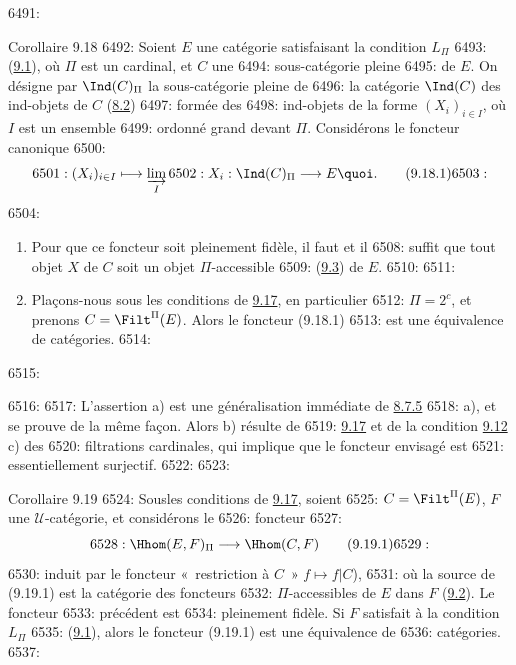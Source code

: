 6491: \begin{enonce*}{Corollaire 9.18}
6492: Soient $E$ une catégorie satisfaisant la condition $L_{\Pi}$
6493: (\hyperref[I.def9.1]{9.1}), où $\Pi$ est un cardinal, et $C$ une
6494: sous-catégorie pleine
6495: de $E$. On désigne par $\Ind(C)_{\Pi}$ la sous-catégorie pleine de
6496: la catégorie $\Ind(C)$ des ind-objets de $C$ (\hyperref[I.sec8.2]{8.2})
6497: formée des
6498: ind-objets de la forme $(X_i)_{i\in I}$, où $I$ est un ensemble
6499: ordonné grand devant $\Pi$. Considérons le foncteur canonique
6500: \begin{equation}
6501: (X_i)_{i\in I}\longmapsto \varinjlim_I
6502: X_i:\Ind(C)_{\Pi}\longrightarrow E{\quoi}.\tag{9.18.1}
6503: \end{equation}
6504: \begin{enumerate}
6505: \renewcommand{\theenumi}{\alph{enumi}}
6506: \renewcommand{\labelenumi}{\theenumi)}
6507: \item Pour que ce foncteur soit pleinement fidèle, il faut et il
6508: suffit que tout objet $X$ de $C$ soit un objet $\Pi$-accessible
6509: (\hyperref[I.def9.3]{9.3}) de $E$.
6510: 
6511: \item Plaçons-nous sous les conditions de \hyperref[I.cor9.17]{9.17}, en particulier
6512: $\Pi=2^c$, et prenons $C=\Filt^{\Pi}(E)$. Alors le foncteur (9.18.1)
6513: est une équivalence de catégories.
6514: \end{enumerate}
6515: \end{enonce*}
6516: 
6517: L'assertion a) est une généralisation immédiate de \hyperref[I.prop8.7.5]{8.7.5}
6518: a), et se prouve de la même façon. Alors b) résulte de
6519: \hyperref[I.cor9.17]{9.17} et de la condition \hyperref[I.def9.12]{9.12} c) des
6520: filtrations cardinales, qui implique que le foncteur envisagé est
6521: essentiellement surjectif.
6522: 
6523: \begin{enonce*}{Corollaire 9.19}
6524: Sous\pageoriginale les conditions de \hyperref[I.cor9.17]{9.17}, soient
6525: $C=\Filt^{\Pi}(E)$, $F$ une $𝒰$-catégorie, et considérons le
6526: foncteur
6527: \begin{equation}
6528: \Hhom(E,F)_{\Pi}\longrightarrow \Hhom(C,F)\tag{9.19.1}
6529: \end{equation}
6530: induit par le foncteur « restriction à $C$ » $f\mapsto f| C$),
6531: où la source de (9.19.1) est la catégorie des foncteurs
6532: $\Pi$-accessibles de $E$ dans $F$ (\hyperref[I.def9.2]{9.2}). Le foncteur
6533: précédent est
6534: pleinement fidèle. Si $F$ satisfait à la condition $L_{\Pi}$
6535: (\hyperref[I.def9.1]{9.1}), alors le foncteur (9.19.1) est une équivalence de
6536: catégories.
6537: \end{enonce*}
